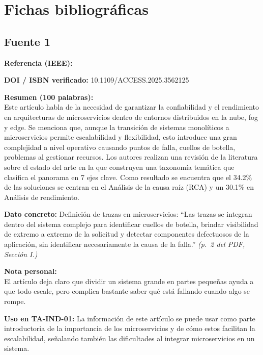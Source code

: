 \documentclass[11pt,a4paper]{article}
\newcommand{\ficha}[7]{%
  \begin{tcolorbox}[colback=white,colframe=black!60,
    title={Ficha bibliográfica},breakable]
    \textbf{Referencia (IEEE):}\\
    \fullcite{#1}

    \medskip
    \textbf{DOI / ISBN verificado:} #2

    \medskip
    \textbf{Resumen (100 palabras):}\\
    #3

    \medskip
    \textbf{Dato concreto:} #4 \textit{(#5)}

    \medskip
    \textbf{Nota personal:}\\
    #6

    \medskip
    \textbf{Uso en TA-IND-01:} #7
  \end{tcolorbox}
  \vspace{1em}
}
\begin{document}
\section{Fichas bibliográficas}

\subsection{Fuente 1}
\ficha{fuente1}{10.1109/ACCESS.2025.3562125}{Este artículo habla de la necesidad de garantizar la confiabilidad y el rendimiento en arquitecturas de microservicios dentro de entornos distribuidos en la nube, fog y edge. Se menciona que, aunque la transición de sistemas monolíticos a microservicios permite escalabilidad y flexibilidad, esto introduce una gran complejidad a nivel operativo causando puntos de falla, cuellos de botella, problemas al gestionar recursos. Los autores realizan una revisión de la literatura sobre el estado del arte en la que construyen una taxonomía temática que clasifica el panorama en 7 ejes clave. Como resultado se encuentra que el 34.2\% de las soluciones se centran en el Análisis de la causa raíz (RCA) y un 30.1\% en Análisis de rendimiento.}{Definición de trazas en microservicios: \enquote {Las trazas se integran dentro del sistema complejo para identificar cuellos de botella, brindar visibilidad de extremo a extremo de la solicitud y detectar componentes defectuosos de la aplicación, sin identificar necesariamente la causa de la falla.}}{p.~2 del PDF, Sección I.}{El artículo deja claro que dividir un sistema grande en partes pequeñas ayuda a que todo escale, pero complica bastante saber qué está fallando cuando algo se rompe. }{La información de este artículo se puede usar como parte introductoria de la importancia de los microservicios y de cómo estos facilitan la escalabilidad, señalando también las dificultades al integrar microservicios en un sistema.}
\end{document}

